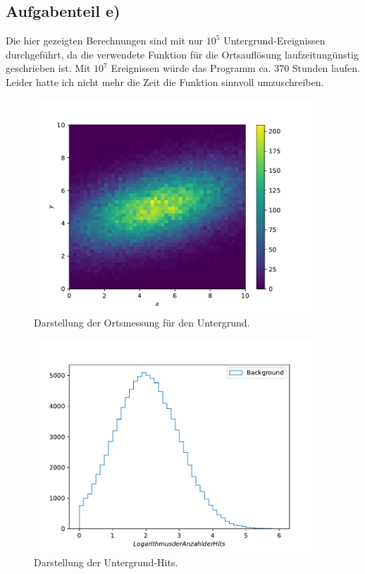 \subsection{Aufgabenteil e)}
Die hier gezeigten Berechnungen sind mit nur $10^5$ Untergrund-Ereignissen durchgeführt,
da die verwendete Funktion für die Ortsauflösung laufzeitungünstig geschrieben ist. Mit $10^7$ Ereignissen würde das Programm ca.
370 Stunden laufen. Leider hatte ich nicht mehr die Zeit die Funktion sinnvoll umzuschreiben.
\begin{figure}[h]
  \centering
  \includegraphics[height = 8cm]{plots/Ort_BKG.pdf}
  \caption{Darstellung der Ortsmessung für den Untergrund.}
  \label{fig:Ort_BKG}
\end{figure}
\begin{figure}[h]
  \centering
  \includegraphics[height = 8cm]{plots/Hits_BKG.pdf}
  \caption{Darstellung der Untergrund-Hits.}
  \label{fig:Hits_BKG}
\end{figure}
